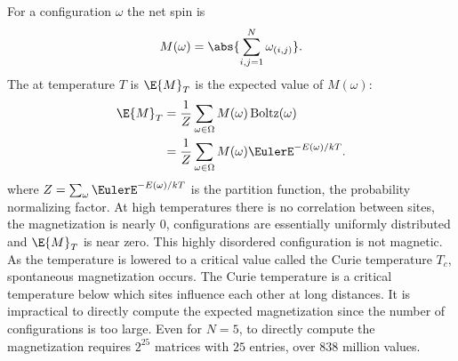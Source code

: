 \documentclass[12pt]{article}
\begin{document}
For a configuration \( \omega \) the net spin is
\[
    M(\omega) = \abs{\sum\limits_{i,j=1}^N \omega_{(i,j)}}.
\] The %
at temperature \( T \) is \( \E{M}_T \) is the expected value of \( M(\omega)
\):
\begin{align*}
    \E{M}_T &= \frac{1}{Z} \sum\limits_{\omega \in \Omega} M(\omega)
    \operatorname{Boltz}
    (\omega) \\
    &= \frac{1}{Z} \sum\limits_{\omega \in \Omega} M(\omega) \EulerE^{-E
    (\omega)/kT}.
\end{align*}
where \( Z = \sum_{\omega} \EulerE^{-E(\omega)/kT} \) is the partition
function,%
the probability normalizing factor.  At high temperatures there is no
correlation between sites, the magnetization is nearly \( 0 \),
configurations are essentially uniformly distributed and \( \E{M}_T \)
is near zero.  This highly disordered configuration is not magnetic.  As
the temperature is lowered to a critical value called the Curie
temperature \( T_c \), spontaneous magnetization occurs.  The Curie
temperature is a critical temperature below which sites influence each
other at long distances.  It is impractical to directly compute the
expected magnetization since the number of configurations is too large.
Even for \( N=5 \), to directly compute the magnetization requires \( 2^
{25} \) matrices with \( 25 \) entries, over \( 838 \) million values.
\end{document}
